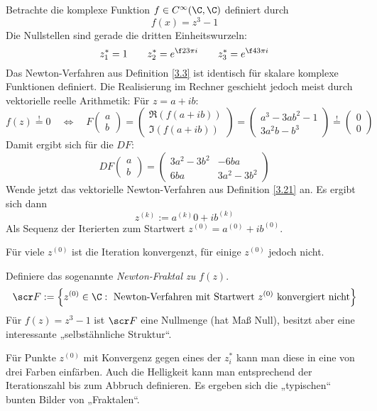 \documentclass[11pt]{scrbook}
\begin{document}
\begin{ex*}
	Betrachte die komplexe Funktion $f\in C^\infty(\C, \C)$ definiert durch
	\[
		f(x) = z^3 - 1
	\]
	Die Nullstellen sind gerade die dritten Einheitswurzeln:
	\[
		z_1^* = 1  \qquad z_2^* = e^{\f 23 \pi i} \qquad z_3^* = e^{\f 43 \pi i}
	\]
	Das Newton-Verfahren aus Definition \ref{3.3} ist identisch für skalare komplexe Funktionen definiert.
	Die Realisierung im Rechner geschieht jedoch meist durch vektorielle reelle Arithmetik:
	Für $z = a+ ib$:
	\[
		f(z) \stackrel != 0  \quad \iff\quad F \begin{pmatrix}
			a \\ b
		\end{pmatrix}
		= \begin{pmatrix}
			\Re(f(a+ib)) \\ \Im(f(a+ib))
		\end{pmatrix}
		= \begin{pmatrix}
			a^3 - 3ab^2 - 1 \\
			3a^2 b - b^3
		\end{pmatrix}  \stackrel != \begin{pmatrix}
			0 \\ 0
		\end{pmatrix}
	\]
	Damit ergibt sich für die $DF$:
	\[
		DF \begin{pmatrix}
			a \\ b
		\end{pmatrix} = \begin{pmatrix}
			3a^2 - 3b^2 & -6ba \\
			6ba & 3a^2 - 3b^2
		\end{pmatrix}
	\]
	Wende jetzt das vektorielle Newton-Verfahren aus Definition \ref{3.21} an.
	Es ergibt sich dann
	\[
		z^{(k)} := a^{(k)}0+ ib^{(k)}
	\]
	Als Sequenz der Iterierten zum Startwert $z^{(0)} = a^{(0)} +ib^{(0)}$.

	Für viele $z^{(0)}$ ist die Iteration konvergenzt, für einige $z^{(0)}$ jedoch nicht.

	Definiere das sogenannte \emph{Newton-Fraktal zu $f(z)$}.
	\[
		\scr F := \Big\{ z^{(0)} \in \C : \text{ Newton-Verfahren mit Startwert $z^{(0)}$ konvergiert nicht} \Big\}
	\]
	Für $f(z) = z^3 - 1$ ist $\scr F$ eine Nullmenge (hat Maß Null), besitzt aber eine interessante „selbstähnliche Struktur“.

	Für Punkte $z^{(0)}$ mit Konvergenz gegen eines der $z_i^*$ kann man diese in eine von drei Farben einfärben.
	Auch die Helligkeit kann man entsprechend der Iterationszahl bis zum Abbruch definieren.
	Es ergeben sich die „typischen“ bunten Bilder von „Fraktalen“.
\end{ex*}
\end{document}
